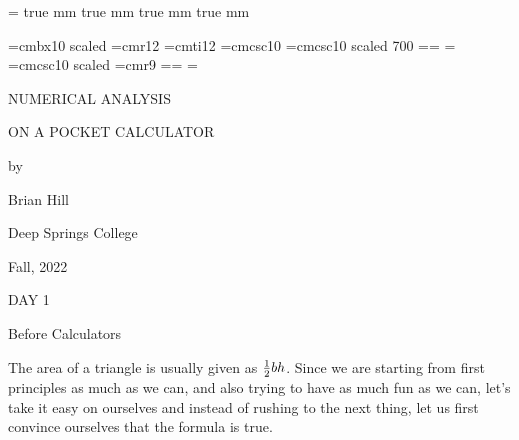 
\magnification=
 true mm  true mm
    true mm  true mm

\def\folio{\ifnum\pageno>0 \number\pageno \else
   \ifnum\pageno<0 \romannumeral-\pageno \else\fi\fi}


\font\Largebf=cmbx10  scaled 
\font\largerm=cmr12
\font\largeit=cmti12
\font\tensc=cmcsc10
\font\sevensc=cmcsc10 scaled 700
\newfam\scfam \def\sc{\fam\scfam\tensc}
\textfont\scfam=\tensc \scriptfont\scfam=\sevensc
\scriptscriptfont\scfam=\sevensc
\font\largesc=cmcsc10 scaled 
\font\ninerm=cmr9
\newfam\srfam \def\sr{\fam\srfam\ninerm}
\textfont\srfam=\ninerm \scriptfont\srfam=\sevenrm
\scriptscriptfont\srfam=\fiverm




\null\vskip72pt

\centerline{\Largebf NUMERICAL ANALYSIS}

\vskip12pt

\centerline{\Largebf ON A POCKET CALCULATOR}

\vskip24pt

\centerline{\Largebf by}

\vskip24pt

\centerline{\Largebf Brian Hill}

\vskip24pt

\centerline{\Largebf Deep Springs College}

\vskip24pt

\centerline{\Largebf Fall, 2022}

\vfill

\eject


\null\vskip36pt

\centerline{\largerm DAY 1}

\vskip 12pt

\centerline{\largeit Before Calculators}

\nobreak\bigskip

The area of a triangle is usually given as ${1\over 2} b h$. Since we are starting from first principles as much as we can, and also trying to have as much fun as we can, let's 
take it easy on ourselves and instead of rushing to the next thing, let us first convince ourselves that the formula is true.

\nobreak\bigskip

\bye

